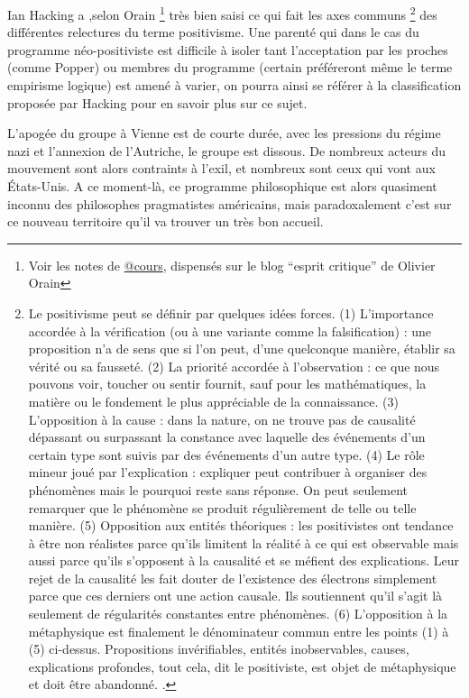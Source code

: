Ian Hacking \autocite{Hacking1983} a ,selon Orain \footnote{Voir les notes de \href{http://www.esprit-critique.net/article-12642840.html}{@cours}, dispensés sur le blog \enquote{esprit critique} de Olivier Orain} très bien saisi ce qui fait les axes communs \footnote{Le positivisme peut se définir par quelques idées forces. (1) L’importance accordée à la vérification (ou à une variante comme la falsification) : une proposition n’a de sens que si l’on peut, d’une quelconque manière, établir sa vérité ou sa fausseté. (2) La priorité accordée à l’observation : ce que nous pouvons voir, toucher ou sentir fournit, sauf pour les mathématiques, la matière ou le fondement le plus appréciable de la connaissance. (3) L’opposition à la cause : dans la nature, on ne trouve pas de causalité dépassant ou surpassant la constance avec laquelle des événements d’un certain type sont suivis par des événements d’un autre type. (4) Le rôle mineur joué par l’explication : expliquer peut contribuer à organiser des phénomènes mais le pourquoi reste sans réponse. On peut seulement remarquer que le phénomène se produit régulièrement de telle ou telle manière. (5) Opposition aux entités théoriques : les positivistes ont tendance à être non réalistes parce qu’ils limitent la réalité à ce qui est observable mais aussi parce qu’ils s’opposent à la causalité et se méfient des explications. Leur rejet de la causalité les fait douter de l’existence des électrons simplement parce que ces derniers ont une action causale. Ils soutiennent qu’il s’agit là seulement de régularités constantes entre phénomènes. (6) L’opposition à la métaphysique est finalement le dénominateur commun entre les points (1) à (5) ci-dessus. Propositions invérifiables, entités inobservables, causes, explications profondes, tout cela, dit le positiviste, est objet de métaphysique et doit être abandonné. \autocite[82]{Hacking1983}.} des différentes relectures du terme positivisme. Une parenté qui dans le cas du programme néo-positiviste est difficile à isoler tant l'acceptation par les proches (comme Popper) ou membres du programme (certain préféreront même le terme empirisme logique) est amené à varier, on pourra ainsi se référer à la classification proposée par Hacking pour en savoir plus sur ce sujet. \autocite[81-86]{Hacking1983}

L'apogée du groupe à Vienne est de courte durée, avec les pressions du régime nazi et l'annexion de l'Autriche, le groupe est dissous. De nombreux acteurs du mouvement sont alors contraints à l'exil, et nombreux sont ceux qui vont aux États-Unis. A ce moment-là, ce programme philosophique est alors quasiment inconnu des philosophes pragmatistes américains, mais paradoxalement c'est sur ce nouveau territoire qu'il va trouver un très bon accueil. 

